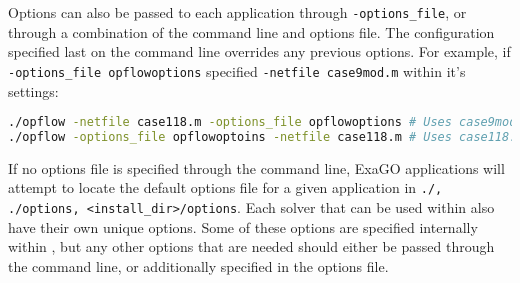 Options can also be passed to each application through \lstinline{-options_file}, or through a combination of the command line and options file. The configuration specified last on the command line overrides any previous options. For example, if \lstinline{-options_file opflowoptions} specified \lstinline{-netfile case9mod.m} within it's settings:
\begin{lstlisting}[language=bash]
./opflow -netfile case118.m -options_file opflowoptions # Uses case9mod.m
./opflow -options_file opflowoptoins -netfile case118.m # Uses case118.m
\end{lstlisting}
If no options file is specified through the command line, ExaGO applications will attempt to locate the default options file for a given application in \lstinline{./, ./options, <install_dir>/options}.
Each solver that can be used within \exago also have their own unique options. Some of these options are specified internally within \exago, but any other options that are needed should either be passed through the command line, or additionally specified in the options file.
